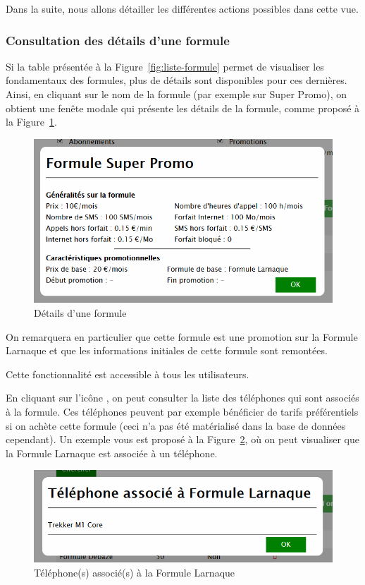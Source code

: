 Dans la suite, nous allons détailler les différentes actions possibles dans cette vue.

\subsubsection{Consultation des détails d'une formule}
Si la table présentée à la Figure~\ref{fig:liste-formule} permet de visualiser les fondamentaux des formules, plus de détails sont disponibles pour ces dernières. Ainsi, en cliquant sur le nom de la formule (par exemple sur \og Super Promo\fg), on obtient une fenête modale qui présente les détails de la formule, comme proposé à la Figure~\ref{fig:details-formule}.

\begin{figure}[ht]
  \centering
  \includegraphics[width=.5\textwidth]{images/Plateforme/detail_formule}
  \caption{Détails d'une formule}
  \label{fig:details-formule}
\end{figure}

On remarquera en particulier que cette formule est une promotion sur la \og Formule Larnaque\fg{} et que les informations initiales de cette formule sont remontées.

Cette fonctionnalité est accessible à tous les utilisateurs.

En cliquant sur l'icône \faMobilePhone{}, on peut consulter la liste des téléphones qui sont associés à la formule. Ces téléphones peuvent par exemple bénéficier de tarifs préférentiels si on achète cette formule (ceci n'a pas été matérialisé dans la base de données cependant). Un exemple vous est proposé à la Figure~\ref{fig:telephones-associes}, où on peut visualiser que la \og Formule Larnaque\fg{} est associée à un téléphone.

\begin{figure}[ht]
  \centering
  \includegraphics[width=.5\textwidth]{images/Plateforme/telephones_associes}
  \caption{Téléphone(s) associé(s) à la \og Formule Larnaque\fg}
  \label{fig:telephones-associes}
\end{figure}

